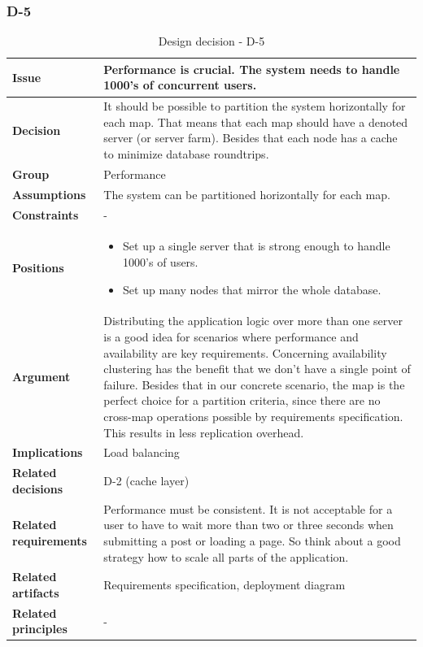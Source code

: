 \documentclass[11pt]{article}
\begin{document}
\newpage

\subsubsection{D-5}

\begin{table}[h] \small
	\begin{tabularx}{\textwidth}{ | l | X |}
    	\hline
	\cellcolor[gray]{0.9}
    	\textbf{Issue} & Performance is crucial. The system needs to handle 1000's of concurrent users. \\
	\hline
	\cellcolor[gray]{0.9}
	\textbf{Decision} & It should be possible to partition the system horizontally for each map. That means that each map should have a denoted server (or server farm). Besides that each node has a cache to minimize database roundtrips. \\
	\hline
	\cellcolor[gray]{0.9}
	\textbf{Group} & Performance \\
	\hline
	\cellcolor[gray]{0.9}
	\textbf{Assumptions} & The system can be partitioned horizontally for each map. \\
	\hline
	\cellcolor[gray]{0.9}
	\textbf{Constraints} & - \\
	\hline
	\cellcolor[gray]{0.9}
	\textbf{Positions} &
		\begin{itemize}
		\item Set up a single server that is strong enough to handle 1000's of users.
		\item Set up many nodes that mirror the whole database.
		\end{itemize}\\
	\hline
	\cellcolor[gray]{0.9}
	\textbf{Argument} & Distributing the application logic over more than one server is a good idea for scenarios where performance and availability are key requirements. Concerning availability clustering has the benefit that we don't have a single point of failure. Besides that in our concrete scenario, the map is the perfect choice for a partition criteria, since there are no cross-map operations possible by requirements specification. This results in less replication overhead. \\
	\hline
	\cellcolor[gray]{0.9}
	\textbf{Implications} & Load balancing \\
	\hline
	\cellcolor[gray]{0.9}
	\textbf{Related decisions} & D-2 (cache layer) \\
	\hline
	\cellcolor[gray]{0.9}
	\textbf{Related requirements} & Performance must be consistent. It is not acceptable for a user to have to wait more than two or three seconds when submitting a post or loading a page. So think about a good strategy how to scale all parts of the application.\\
	\hline
	\cellcolor[gray]{0.9}
	\textbf{Related artifacts} & Requirements specification, deployment diagram\\
	\hline
	\cellcolor[gray]{0.9}
	\textbf{Related principles} & -\\
	\hline
	\end{tabularx}
	\caption{Design decision - D-5}
	\label{dec:D5}
\end{table}
\end{document}
